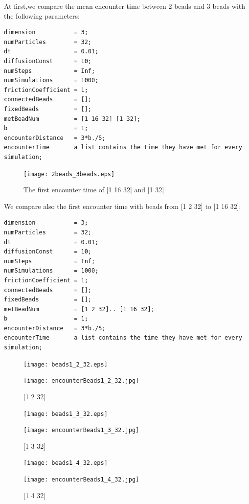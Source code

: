 \documentclass{article}
\begin{document}
At first,we compare the mean encounter time between 2 beads and 3 beads with the following parameters:
\begin{lstlisting}
dimension           = 3;
numParticles        = 32;
dt                  = 0.01;
diffusionConst      = 10;
numSteps            = Inf;
numSimulations      = 1000;
frictionCoefficient = 1;
connectedBeads      = [];
fixedBeads          = [];
metBeadNum          = [1 16 32] [1 32];
b                   = 1;
encounterDistance   = 3*b./5;
encounterTime       a list contains the time they have met for every simulation;      
\end{lstlisting}
\begin{figure}[H]
	\centering
	\texttt{[image: 2beads\_3beads.eps]}
	\caption{The first encounter time of [1 16 32] and [1 32]}
\end{figure}
\pagebreak
We compare also the first encounter time with beads from [1 2 32] to [1 16 32]:\\
\begin{lstlisting}
dimension           = 3;
numParticles        = 32;
dt                  = 0.01;
diffusionConst      = 10;
numSteps            = Inf;
numSimulations      = 1000;
frictionCoefficient = 1;
connectedBeads      = [];
fixedBeads          = [];
metBeadNum          = [1 2 32].. [1 16 32];
b                   = 1;
encounterDistance   = 3*b./5;
encounterTime       a list contains the time they have met for every simulation;      
\end{lstlisting}
\begin{figure}[H]
	\begin{minipage}[t]{0.5\textwidth}
		\centering
		\texttt{[image: beads1\_2\_32.eps]}
		\end{minipage}%
		\begin{minipage}[t]{1.0\textwidth}
			\centering
			\texttt{[image: encounterBeads1\_2\_32.jpg]}
			\end{minipage}
			\caption{[1 2 32]}
		\end{figure}
		\begin{figure}[H]
			\begin{minipage}[t]{0.5\textwidth}
				\centering
				\texttt{[image: beads1\_3\_32.eps]}
			\end{minipage}%
			\begin{minipage}[t]{1.0\textwidth}
				\centering
				\texttt{[image: encounterBeads1\_3\_32.jpg]}
			\end{minipage}
		    \caption{[1 3 32]}
		\end{figure}
			\begin{figure}[H]
				\begin{minipage}[t]{0.5\textwidth}
					\centering
					\texttt{[image: beads1\_4\_32.eps]}
				\end{minipage}%
				\begin{minipage}[t]{1.0\textwidth}
					\centering
					\texttt{[image: encounterBeads1\_4\_32.jpg]}
				\end{minipage}
			    \caption{[1 4 32]}
			\end{figure}
\end{document}
